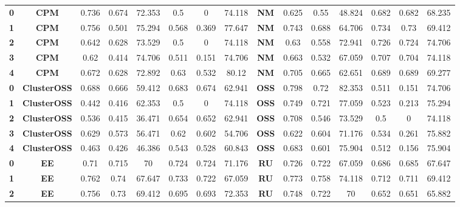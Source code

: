 {{\begin{tabular}{c|c|cccccc|ccccccc}
\textbf{0} & \textbf{CPM} & 0.736 & 0.674 & 72.353 & 0.5   & 0     & 74.118 & \multicolumn{1}{c|}{\textbf{NM}} & 0.625 & 0.55  & 48.824 & 0.682 & 0.682 & 68.235 \\
\textbf{1} & \textbf{CPM} & 0.756 & 0.501 & 75.294 & 0.568 & 0.369 & 77.647 & \multicolumn{1}{c|}{\textbf{NM}} & 0.743 & 0.688 & 64.706 & 0.734 & 0.73  & 69.412 \\
\textbf{2} & \textbf{CPM} & 0.642 & 0.628 & 73.529 & 0.5   & 0     & 74.118 & \multicolumn{1}{c|}{\textbf{NM}} & 0.63  & 0.558 & 72.941 & 0.726 & 0.724 & 74.706 \\
\textbf{3} & \textbf{CPM} & 0.62  & 0.414 & 74.706 & 0.511 & 0.151 & 74.706 & \multicolumn{1}{c|}{\textbf{NM}} & 0.663 & 0.532 & 67.059 & 0.707 & 0.704 & 74.118 \\
\textbf{4} & \textbf{CPM} & 0.672 & 0.628 & 72.892 & 0.63  & 0.532 & 80.12 & \multicolumn{1}{c|}{\textbf{NM}} & 0.705 & 0.665 & 62.651 & 0.689 & 0.689 & 69.277 \\
\textbf{0} & \textbf{ClusterOSS} & 0.688 & 0.666 & 59.412 & 0.683 & 0.674 & 62.941 & \multicolumn{1}{c|}{\textbf{OSS}} & 0.798 & 0.72  & 82.353 & 0.511 & 0.151 & 74.706 \\
\textbf{1} & \textbf{ClusterOSS} & 0.442 & 0.416 & 62.353 & 0.5   & 0     & 74.118 & \multicolumn{1}{c|}{\textbf{OSS}} & 0.749 & 0.721 & 77.059 & 0.523 & 0.213 & 75.294 \\
\textbf{2} & \textbf{ClusterOSS} & 0.536 & 0.415 & 36.471 & 0.654 & 0.652 & 62.941 & \multicolumn{1}{c|}{\textbf{OSS}} & 0.708 & 0.546 & 73.529 & 0.5   & 0     & 74.118 \\
\textbf{3} & \textbf{ClusterOSS} & 0.629 & 0.573 & 56.471 & 0.62  & 0.602 & 54.706 & \multicolumn{1}{c|}{\textbf{OSS}} & 0.622 & 0.604 & 71.176 & 0.534 & 0.261 & 75.882 \\
\textbf{4} & \textbf{ClusterOSS} & 0.463 & 0.426 & 46.386 & 0.543 & 0.528 & 60.843 & \multicolumn{1}{c|}{\textbf{OSS}} & 0.683 & 0.601 & 75.904 & 0.512 & 0.156 & 75.904 \\
\textbf{0} & \textbf{EE} & 0.71  & 0.715 & 70    & 0.724 & 0.724 & 71.176 & \multicolumn{1}{c|}{\textbf{RU}} & 0.726 & 0.722 & 67.059 & 0.686 & 0.685 & 67.647 \\
\textbf{1} & \textbf{EE} & 0.762 & 0.74  & 67.647 & 0.733 & 0.722 & 67.059 & \multicolumn{1}{c|}{\textbf{RU}} & 0.773 & 0.758 & 74.118 & 0.712 & 0.711 & 69.412 \\
\textbf{2} & \textbf{EE} & 0.756 & 0.73  & 69.412 & 0.695 & 0.693 & 72.353 & \multicolumn{1}{c|}{\textbf{RU}} & 0.748 & 0.722 & 70    & 0.652 & 0.651 & 65.882 \\

\end{tabular}}}
